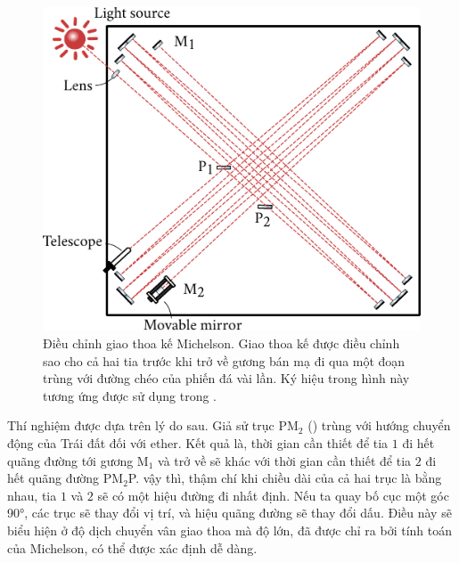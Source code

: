 \begin{figure}[!htb]
	\begin{center}
		\includegraphics[scale=1]{figures/ch_21/fig_21_5.pdf}
        \caption[]{Điều chỉnh giao thoa kế Michelson. Giao thoa kế được điều chỉnh sao cho cả hai tia trước khi trở về gương bán mạ đi qua một đoạn trùng với đường chéo của phiến đá vài lần. Ký hiệu trong hình này tương ứng được sử dụng trong .}
		\label{fig:21_5}
	\end{center}
	\vspace{-0.8cm}
\end{figure}

Thí nghiệm được dựa trên lý do sau. Giả sử trục  PM$_2$ () trùng với hướng chuyển động của Trái đất đối với ether.
Kết quả là, thời gian cần thiết để tia $1$ đi hết quãng đường tới gương M$_1$ và trở về sẽ khác với thời gian cần thiết để tia $2$ đi hết quãng đường PM$_2$P.
vậy thì, thậm chí khi chiều dài của cả hai trục là bằng nhau, tia $1$ và $2$ sẽ có một hiệu đường đi nhất định.
Nếu ta quay bố cục một góc \ang{90}, các trục sẽ thay đổi vị trí, và hiệu quãng đường sẽ thay đổi dấu.
Điều này sẽ biểu hiện ở độ dịch chuyển vân giao thoa mà độ lớn, đã được chỉ ra bởi tính toán của Michelson, có thể được xác định dễ dàng.

